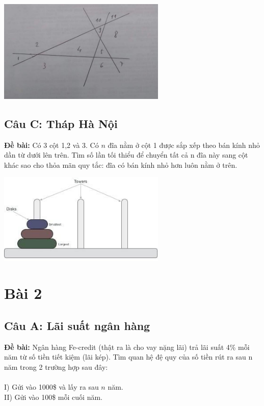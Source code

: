 \documentclass[12pt]{article}
\begin{document}
\begin{sloppypar}
\begin{center}
    {\includegraphics[width=8cm]{1b.png}}
\end{center}

\subsection{Câu C: Tháp Hà Nội}
\begin{tcolorbox}
    \textbf{Đề bài:} Có 3 cột 1,2 và 3. Có \(n\) đĩa nằm ở cột 1 được sắp xếp theo bán kính nhỏ dần từ dưới lên trên. Tìm số lần tối thiểu để chuyển tất cả n đĩa này sang cột khác sao cho thỏa mãn quy tắc:  đĩa có bán kính nhỏ hơn luôn nằm ở trên.
\end{tcolorbox}

\begin{center}
    {\includegraphics[width=8cm]{toh.png}}
\end{center}

\section{Bài 2}

\subsection{Câu A: Lãi suất ngân hàng}
\begin{tcolorbox}
    \textbf{Đề bài:} Ngân hàng Fe-credit (thật ra là cho vay nặng lãi) trả lãi suất 4\% mỗi năm từ số tiền tiết kiệm (lãi kép). Tìm quan hệ đệ quy của số tiền rút ra sau n năm trong 2 trường hợp sau đây: \\ \\
    I)  Gửi vào 1000\$ và lấy ra sau \(n\) năm. \\
    II) Gửi vào 100\$ mỗi cuối năm.
\end{tcolorbox}


\end{sloppypar}
\end{document}
